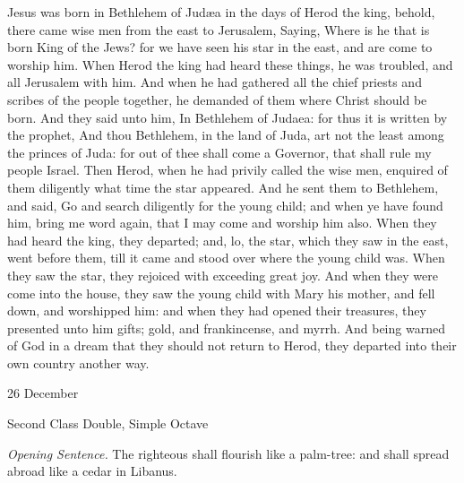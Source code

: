  Jesus was born in Bethlehem of Jud{\ae}a in the days of Herod the king, behold, there came wise men from the east to Jerusalem, Saying, Where is he that is born King of the Jews? for we have seen his star in the east, and are come to worship him. When Herod the king had heard these things, he was troubled, and all Jerusalem with him. And when he had gathered all the chief priests and scribes of the people together, he demanded of them where Christ should be born. And they said unto him, In Bethlehem of Judaea: for thus it is written by the prophet, And thou Bethlehem, in the land of Juda, art not the least among the princes of Juda: for out of thee shall come a Governor, that shall rule my people Israel. Then Herod, when he had privily called the wise men, enquired of them diligently what time the star appeared. And he sent them to Bethlehem, and said, Go and search diligently for the young child; and when ye have found him, bring me word again, that I may come and worship him also. When they had heard the king, they departed; and, lo, the star, which they saw in the east, went before them, till it came and stood over where the young child was. When they saw the star, they rejoiced with exceeding great joy. And when they were come into the house, they saw the young child with Mary his mother, and fell down, and worshipped him: and when they had opened their treasures, they presented unto him gifts; gold, and frankincense, and myrrh. And being warned of God in a dream that they should not return to Herod, they departed into their own country another way.

\clearpage

\begin{inhead}
{26 December}\par
{Second Class Double, Simple Octave}
\end{inhead}
\par\noindent
\textit{Opening Sentence.} The righteous shall flourish like a palm-tree: and shall spread abroad like a cedar in Libanus.
 


